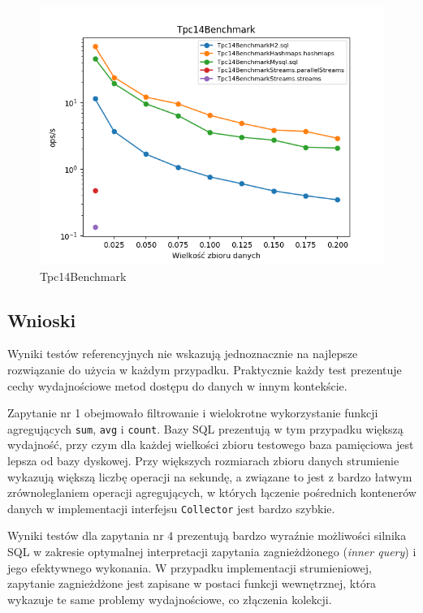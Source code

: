 \documentclass[12pt]{extarticle}
\begin{document}
\begin{figure}[H]
\centering
\includegraphics[width=15cm]{plots/Tpc14Benchmark}
\caption{Tpc14Benchmark}
\end{figure}


\subsection{Wnioski}

    Wyniki testów referencyjnych nie wskazują jednoznacznie na najlepsze rozwiązanie do użycia w każdym przypadku. Praktycznie każdy test prezentuje cechy wydajnościowe metod dostępu do danych w innym kontekście.

    Zapytanie nr 1 obejmowało filtrowanie i wielokrotne wykorzystanie funkcji agregujących \texttt{sum}, \texttt{avg} i \texttt{count}. Bazy SQL prezentują w tym przypadku większą wydajność, przy czym dla każdej wielkości zbioru testowego baza pamięciowa jest lepsza od bazy dyskowej. Przy większych rozmiarach zbioru danych strumienie wykazują większą liczbę operacji na sekundę, a związane to jest z bardzo łatwym zrównoleglaniem operacji agregujących, w których łączenie pośrednich kontenerów danych w implementacji interfejsu \texttt{Collector} jest bardzo szybkie.

    Wyniki testów dla zapytania nr 4 prezentują bardzo wyraźnie możliwości silnika SQL w zakresie optymalnej interpretacji zapytania zagnieżdżonego (\textit{inner query}) i jego efektywnego wykonania. W przypadku implementacji strumieniowej, zapytanie zagnieżdżone jest zapisane w postaci funkcji wewnętrznej, która wykazuje te same problemy wydajnościowe, co złączenia kolekcji. 
\end{document}
